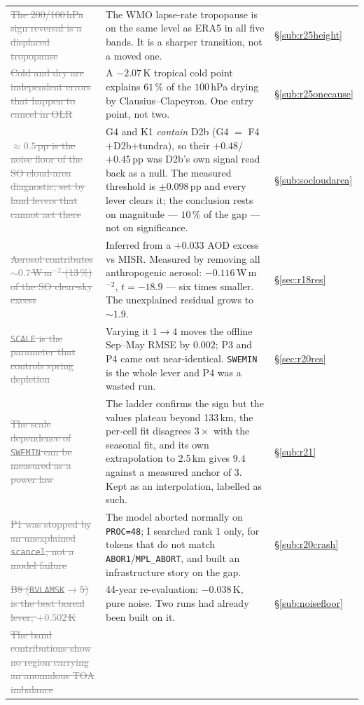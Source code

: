 \documentclass[10pt]{article}
\newcommand{\dead}[1]{\textcolor{gray}{\sout{#1}}}
\begin{document}
\begin{center}
\begin{tabular}{p{} p{} l}
\dead{The 200/100\,hPa sign reversal is a displaced tropopause} &
The WMO lapse-rate tropopause is on the same level as ERA5 in all five bands. It is a
sharper transition, not a moved one. & \S\ref{sub:r25height} \\
\dead{Cold and dry are independent errors that happen to cancel in OLR} &
A $-2.07$\,K tropical cold point explains $61\,\%$ of the $100$\,hPa drying by
Clausius--Clapeyron. One entry point, not two. & \S\ref{sub:r25onecause} \\
\dead{${\approx}0.5$\,pp is the noise floor of the SO cloud-area diagnostic, set by land
levers that cannot act there} &
G4 and K1 \emph{contain} D2b (G4 $=$ F4$+$D2b$+$tundra), so their $+0.48$/$+0.45$\,pp was
D2b's own signal read back as a null. The measured threshold is $\pm0.098$\,pp and every
lever clears it; the conclusion rests on magnitude --- $10\,\%$ of the gap --- not on
significance. & \S\ref{sub:socloudarea} \\
\dead{Aerosol contributes ${\sim}0.7$\,W\,m$^{-2}$ (13\,\%) of the SO clear-sky excess} &
Inferred from a $+0.033$ AOD excess vs MISR. Measured by removing all anthropogenic
aerosol: $-0.116$\,W\,m$^{-2}$, $t=-18.9$ --- six times smaller. The unexplained residual
grows to ${\sim}1.9$. & \S\ref{sec:r18res} \\
\dead{\texttt{SCALE} is the parameter that controls spring depletion} &
Varying it $1\to4$ moves the offline Sep--May RMSE by $0.002$; P3 and P4 came out
near-identical. \texttt{SWEMIN} is the whole lever and P4 was a wasted run. &
\S\ref{sec:r20res} \\
\dead{The scale dependence of \texttt{SWEMIN} can be measured as a power law} &
The ladder confirms the sign but the values plateau beyond 133\,km, the per-cell fit
disagrees $3\times$ with the seasonal fit, and its own extrapolation to 2.5\,km gives $9.4$
against a measured anchor of $3$. Kept as an interpolation, labelled as such. &
\S\ref{sub:r21} \\
\dead{P1 was stopped by an unexplained \texttt{scancel}, not a model failure} &
The model aborted normally on \texttt{PROC=48}; I searched rank 1 only, for tokens that do
not match \texttt{ABOR1}/\texttt{MPL\_ABORT}, and built an infrastructure story on the gap.
& \S\ref{sub:r20crash} \\
\dead{B8 (\texttt{RVLAMSK}$\to$5) is the best boreal lever, $+0.502$\,K} &
44-year re-evaluation: $-0.038$\,K, pure noise. Two runs had already been built on it. &
\S\ref{sub:noisefloor} \\
\dead{The band contributions show no region carrying an anomalous TOA imbalance} &

\end{tabular}
\end{center}
\end{document}
